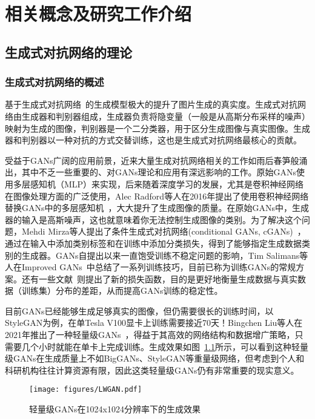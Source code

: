 \chapter{相关概念及研究工作介绍}

\section{生成式对抗网络的理论}

\subsection{生成式对抗网络的概述}

基于生成式对抗网络~\cite{GANs}的生成模型极大的提升了图片生成的真实度。生成式对抗网络由生成器和判别器组成，生成器负责将隐变量（一般是从高斯分布采样的噪声）映射为生成的图像，判别器是一个二分类器，用于区分生成图像与真实图像。生成器和判别器以一种对抗的方式交替训练，这也是生成式对抗网络最核心的贡献。

受益于GANs广阔的应用前景，近来大量生成对抗网络相关的工作如雨后春笋般涌出，其中不乏一些重要的、对GANs理论和应用有深远影响的工作。原始GANs使用多层感知机（MLP）来实现，后来随着深度学习的发展，尤其是卷积神经网络在图像处理方面的广泛使用，Alec Radford等人在2016年提出了使用卷积神经网络替换GANs中的多层感知机~\cite{DCGAN}，大大提升了生成图像的质量。在原始GANs中，生成器的输入是高斯噪声，这也就意味着你无法控制生成图像的类别。为了解决这个问题，Mehdi Mirza等人提出了条件生成式对抗网络(conditional GANs, cGANs)~\cite{CGANs}，通过在输入中添加类别标签和在训练中添加分类损失，得到了能够指定生成数据类别的生成器。GANs自提出以来一直饱受训练不稳定问题的影响，Tim Salimans等人在Improved GANs~\cite{salimans2016improved}中总结了一系列训练技巧，目前已称为训练GANs的常规方案。还有一些文献~\cite{wgan, lsgan}则提出了新的损失函数，目的是更好地衡量生成数据与真实数据（训练集）分布的差距，从而提高GANs训练的稳定性。

目前GANs已经能够生成足够真实的图像，但仍需要很长的训练时间，以StyleGAN为例，在单Tesla V100显卡上训练需要接近70天！Bingchen Liu等人在2021年推出了一种轻量级GANs~\cite{lwgan}，得益于其高效的网络结构和数据增广策略，只需要几个小时就能在单卡上完成训练。生成效果如图~\ref{fig:LWGAN}所示，可以看到这种轻量级GANs在生成质量上不如BigGANs、StyleGAN等重量级网络，但考虑到个人和科研机构往往计算资源有限，因此这类轻量级GANs仍有非常重要的现实意义。

\begin{figure}
    \centering
    \texttt{[image: figures/LWGAN.pdf]}
    \caption{轻量级GANs在1024x1024分辨率下的生成效果}
    \label{fig:LWGAN}
\end{figure}

